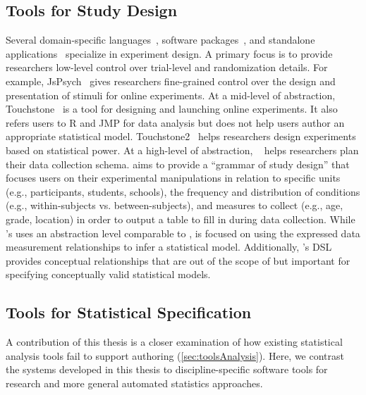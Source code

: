 \subsection{Tools for Study Design}
Several domain-specific languages~\cite{gosset,bakshy2014planout}, software
packages~\cite{edibble,blair2019declaring}, and standalone
applications~\cite{mackay2007touchstone,eiselmayer2019touchstone2} specialize in
experiment design. A primary focus is to provide researchers low-level control
over trial-level and randomization details. For example,
JsPsych~\cite{deLeeuw2015jspsych} gives researchers fine-grained control over
the design and presentation of stimuli for online experiments. At a mid-level of
abstraction, Touchstone~\cite{mackay2007touchstone} is a %
tool for designing and launching online experiments. It also refers users to R
and JMP for data analysis but does not help users author an appropriate
statistical model. Touchstone2~\cite{eiselmayer2019touchstone2} helps
researchers design experiments based on statistical power. At a high-level of
abstraction, \edibble~\cite{edibble} helps researchers plan their data collection
schema. \edibble aims to provide a ``grammar of study design'' that focuses users
on their experimental manipulations in relation to specific units (e.g.,
participants, students, schools), the frequency and distribution of conditions
(e.g., within-subjects vs. between-subjects), and measures to collect (e.g.,
age, grade, location) in order to output a table to fill in during data
collection. While \tisane's \SDSLlong uses an abstraction level comparable to
\edibble, \tisane is focused on using the expressed data measurement relationships
to infer a statistical model. Additionally, \tisane's DSL provides conceptual
relationships that are out of the scope of \edibble but important for specifying
conceptually valid statistical models.


\subsection{Tools for Statistical Specification}
A contribution of this thesis is a closer examination of how existing
statistical analysis tools fail to support authoring
(\autoref{sec:toolsAnalysis}). Here, we contrast the systems developed in this
thesis to discipline-specific software tools for research and more general
automated statistics approaches. 

